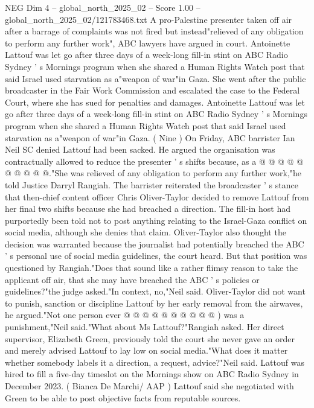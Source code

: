 \begin{textsample}{NEG Dim 4 – global\_north\_2025\_02 – Score 1.00 – global\_north\_2025\_02/121783468.txt}  \label{ex:f4_neg_405}
A pro-Palestine presenter taken off air after a barrage of complaints was not fired but instead"relieved of any obligation to perform any further work", ABC lawyers have argued in court.
Antoinette Lattouf was let go after three days of a week-long fill-in stint on ABC Radio Sydney ' s Mornings program when she shared a Human Rights Watch post that said Israel used starvation as a"weapon of war"in Gaza.
She went after the public broadcaster in the Fair Work Commission and escalated the case to the Federal Court, where she has sued for penalties and damages.
Antoinette Lattouf was let go after three days of a week-long fill-in stint on ABC Radio Sydney ' s Mornings program when she shared a Human Rights Watch post that said Israel used starvation as a"weapon of war"in Gaza. ( Nine ) On Friday, ABC barrister Ian Neil SC denied Lattouf had been sacked.
He argued the organisation was contractually allowed to reduce the presenter ' s shifts because, as a @ @ @ @ @ @ @ @ @ @."She was relieved of any obligation to perform any further work,"he told Justice Darryl Rangiah.
The barrister reiterated the broadcaster ' s stance that then-chief content officer Chris Oliver-Taylor decided to remove Lattouf from her final two shifts because she had breached a direction.
The fill-in host had purportedly been told not to post anything relating to the Israel-Gaza conflict on social media, although she denies that claim.
Oliver-Taylor also thought the decision was warranted because the journalist had potentially breached the ABC ' s personal use of social media guidelines, the court heard.
But that position was questioned by Rangiah."Does that sound like a rather flimsy reason to take the applicant off air, that she may have breached the ABC ' s policies or guidelines?"the judge asked."In context, no,"Neil said.
Oliver-Taylor did not want to punish, sanction or discipline Lattouf by her early removal from the airwaves, he argued."Not one person ever @ @ @ @ @ @ @ @ @ @ ) was a punishment,"Neil said."What about Ms Lattouf?"Rangiah asked.
Her direct supervisor, Elizabeth Green, previously told the court she never gave an order and merely advised Lattouf to lay low on social media."What does it matter whether somebody labels it a direction, a request, advice?"Neil said.
Lattouf was hired to fill a five-day timeslot on the Mornings show on ABC Radio Sydney in December 2023. ( Bianca De Marchi/ AAP ) Lattouf said she negotiated with Green to be able to post objective facts from reputable sources.

\end{textsample}
